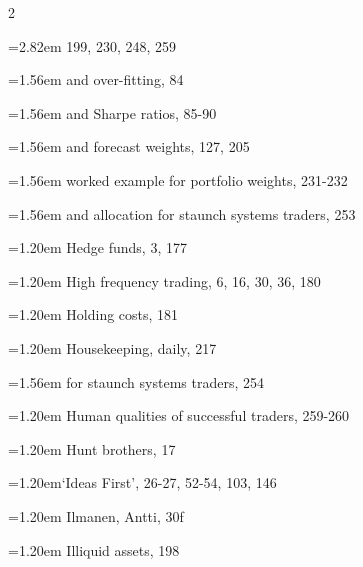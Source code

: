 {\begin{multicols}{2}
\par \noindent\hangindent=2.82em\hspace*{1.62em} 199, 230, 248, 259
\par \noindent\hangindent=1.56em\hspace*{0.36em} and over-fitting, 84
\par \noindent\hangindent=1.56em\hspace*{0.36em} and Sharpe ratios, 85-90
\par \noindent\hangindent=1.56em\hspace*{0.36em} and forecast weights, 127, 205
\par \noindent\hangindent=1.56em\hspace*{0.36em} worked example for portfolio weights, 231-232
\par \noindent\hangindent=1.56em\hspace*{0.36em} and allocation for staunch systems traders, 253
\par \noindent\hangindent=1.20em\hspace*{0.00em} Hedge funds, 3, 177
\par \noindent\hangindent=1.20em\hspace*{0.00em} High frequency trading, 6, 16, 30, 36, 180
\par \noindent\hangindent=1.20em\hspace*{0.00em} Holding costs, 181
\par \noindent\hangindent=1.20em\hspace*{0.00em} Housekeeping, daily, 217
\par \noindent\hangindent=1.56em\hspace*{0.36em} for staunch systems traders, 254
\par \noindent\hangindent=1.20em\hspace*{0.00em} Human qualities of successful traders, 259-260
\par \noindent\hangindent=1.20em\hspace*{0.00em} Hunt brothers, 17
\par \noindent\hangindent=1.20em\hspace*{0.00em}‘Ideas First’, 26-27, 52-54, 103, 146
\par \noindent\hangindent=1.20em\hspace*{0.00em} Ilmanen, Antti, 30f
\par \noindent\hangindent=1.20em\hspace*{0.00em} Illiquid assets, 198

\end{multicols}}
